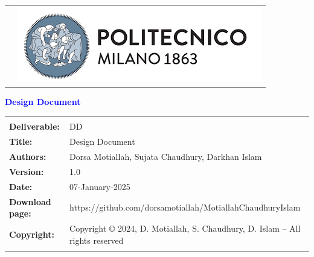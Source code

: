 \documentclass [11pt,twoside]{article}
\date{}
\begin{document}

\begin{titlepage}



\begin{table}[t!]
\centering
{}
\end{table}


\begin{flushleft}

{\textcolor{Blue}{\textbf{\Huge{Design Document}}}} \\ [1cm]

\end{flushleft}

\begin{table}[h!]
\begin{tabu} to \textwidth { X[0.3,r,p] X[0.7,l,p] }
\hline
\\
\textbf{Deliverable:} & DD\\
\textbf{Title:} & Design Document\\
\textbf{Authors:} & Dorsa Motiallah, Sujata Chaudhury, Darkhan Islam \\
\textbf{Version:} & 1.0 \\ 
\textbf{Date:} & 07-January-2025 \\
\textbf{Download page:} & https://github.com/dorsamotiallah/MotiallahChaudhuryIslam \\
\textbf{Copyright:} & Copyright © 2024, D. Motiallah, S. Chaudhury, D. Islam – All rights reserved \\ \\

\hline
\end{tabu}
\end{table}

\end{titlepage}
\end{document}
